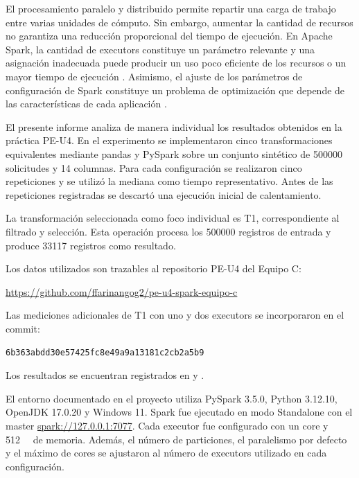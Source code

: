 \documentclass[12pt,a4paper]{article}
\begin{document}
El procesamiento paralelo y distribuido permite repartir una carga de trabajo
entre varias unidades de cómputo. Sin embargo, aumentar la cantidad de recursos
no garantiza una reducción proporcional del tiempo de ejecución. En Apache
Spark, la cantidad de executors constituye un parámetro relevante y una
asignación inadecuada puede producir un uso poco eficiente de los recursos o
un mayor tiempo de ejecución \cite{sen2021}. Asimismo, el ajuste de los
parámetros de configuración de Spark constituye un problema de optimización
que depende de las características de cada aplicación \cite{cheng2021}.

El presente informe analiza de manera individual los resultados obtenidos en la
práctica PE-U4. En el experimento se implementaron cinco transformaciones
equivalentes mediante pandas y PySpark sobre un conjunto sintético de
\num{500000} solicitudes y 14 columnas. Para cada configuración se realizaron
cinco repeticiones y se utilizó la mediana como tiempo representativo. Antes de
las repeticiones registradas se descartó una ejecución inicial de calentamiento.

La transformación seleccionada como foco individual es T1, correspondiente al
filtrado y selección. Esta operación procesa los \num{500000} registros de
entrada y produce \num{33117} registros como resultado.

Los datos utilizados son trazables al repositorio PE-U4 del Equipo C:

\begin{center}
\url{https://github.com/ffarinangog2/pe-u4-spark-equipo-c}
\end{center}

\noindent
Las mediciones adicionales de T1 con uno y dos executors se incorporaron en el
commit:

\begin{center}
\texttt{\footnotesize 6b363abdd30e57425fc8e49a9a13181c2cb2a5b9}
\end{center}

\noindent
Los resultados se encuentran registrados en
 y
.

El entorno documentado en el proyecto utiliza PySpark 3.5.0, Python 3.12.10,
OpenJDK 17.0.20 y Windows 11. Spark fue ejecutado en modo Standalone con el
master \url{spark://127.0.0.1:7077}. Cada executor fue configurado con un
core y \SI{512}{\mebi\byte} de memoria. Además, el número de particiones, el
paralelismo por defecto y el máximo de cores se ajustaron al número de
executors utilizado en cada configuración.
\end{document}
